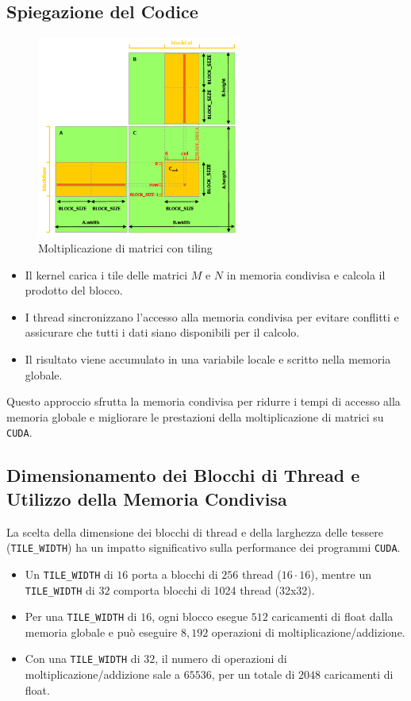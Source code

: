 \subsection{Spiegazione del Codice}
\begin{figure}[H]
    \centering
    \includegraphics[width=0.6\textwidth]{img/matrix_mul_tiles.png}
    \caption{Moltiplicazione di matrici con tiling}
\end{figure}
\begin{itemize}
    \item Il kernel carica i tile delle matrici \(M\) e \(N\) in memoria condivisa
    e calcola il prodotto del blocco.
    \item I thread sincronizzano l'accesso alla memoria condivisa per evitare
    conflitti e assicurare che tutti i dati siano disponibili per il calcolo.
    \item Il risultato viene accumulato in una variabile locale e scritto nella
    memoria globale.
\end{itemize}

Questo approccio sfrutta la memoria condivisa per ridurre i tempi di accesso
alla memoria globale e migliorare le prestazioni della moltiplicazione di matrici
su \texttt{CUDA}.

\subsection{Dimensionamento dei Blocchi di Thread e Utilizzo della Memoria Condivisa}
La scelta della dimensione dei blocchi di thread e della larghezza delle tessere (\texttt{TILE\_WIDTH}) ha un impatto significativo sulla performance dei programmi \texttt{CUDA}. 

\begin{itemize}
    \item Un \texttt{TILE\_WIDTH} di $16$ porta a blocchi di $256$
    thread ($16\cdot16$), mentre un \texttt{TILE\_WIDTH} di $32$ comporta
    blocchi di 1024 thread (32x32).
    \item Per una \texttt{TILE\_WIDTH} di $16$, ogni blocco esegue
    $512$ caricamenti di float dalla memoria globale e può eseguire
    $8,192$ operazioni di moltiplicazione/addizione.
    \item Con una \texttt{TILE\_WIDTH} di $32$, il numero di
    operazioni di moltiplicazione/addizione sale a $65536$, per
    un totale di $2048$ caricamenti di float.
\end{itemize}

